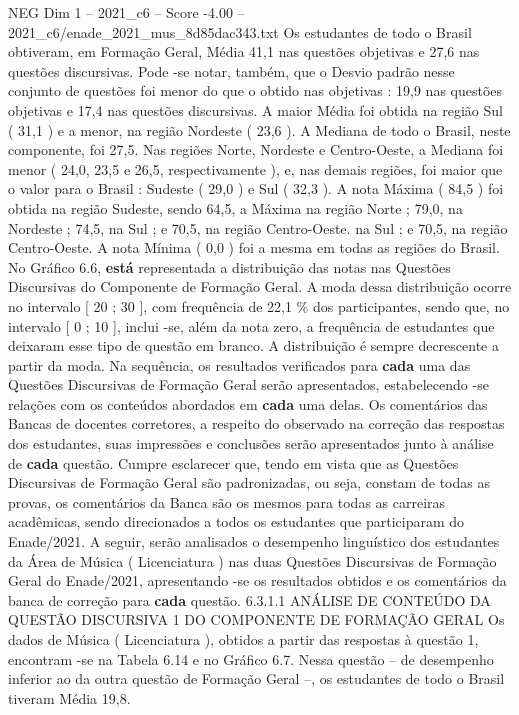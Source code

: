\begin{textsample}{NEG Dim 1 – 2021\_c6 – Score -4.00 – 2021\_c6/enade\_2021\_mus\_8d85dac343.txt}
Os estudantes de todo o Brasil obtiveram, em Formação Geral, Média 41,1 nas questões objetivas e 27,6 nas questões discursivas.
Pode -se notar, também, que o Desvio padrão nesse conjunto de questões foi menor do que o obtido nas objetivas : 19,9 nas questões objetivas e 17,4 nas questões discursivas.
A maior Média foi obtida na região Sul ( 31,1 ) e a menor, na região Nordeste ( 23,6 ).
A Mediana de todo o Brasil, neste componente, foi 27,5.
Nas regiões Norte, Nordeste e Centro-Oeste, a Mediana foi menor ( 24,0, 23,5 e 26,5, respectivamente ), e, nas demais regiões, foi maior que o valor para o Brasil : Sudeste ( 29,0 ) e Sul ( 32,3 ).
A nota Máxima ( 84,5 ) foi obtida na região Sudeste, sendo 64,5, a Máxima na região Norte ; 79,0, na Nordeste ; 74,5, na Sul ; e 70,5, na região Centro-Oeste. na Sul ; e 70,5, na região Centro-Oeste.
A nota Mínima ( 0,0 ) foi a mesma em todas as regiões do Brasil.
No Gráfico 6.6, \textbf{está} representada a distribuição das notas nas Questões Discursivas do Componente de Formação Geral.
A moda dessa distribuição ocorre no intervalo [ 20 ; 30 ], com frequência de 22,1 \% dos participantes, sendo que, no intervalo [ 0 ; 10 ], inclui -se, além da nota zero, a frequência de estudantes que deixaram esse tipo de questão em branco.
A distribuição é sempre decrescente a partir da moda.
Na sequência, os resultados verificados para \textbf{cada} uma das Questões Discursivas de Formação Geral serão apresentados, estabelecendo -se relações com os conteúdos abordados em \textbf{cada} uma delas.
Os comentários das Bancas de docentes corretores, a respeito do observado na correção das respostas dos estudantes, suas impressões e conclusões serão apresentados junto à análise de \textbf{cada} questão.
Cumpre esclarecer que, tendo em vista que as Questões Discursivas de Formação Geral são padronizadas, ou seja, constam de todas as provas, os comentários da Banca são os mesmos para todas as carreiras acadêmicas, sendo direcionados a todos os estudantes que participaram do Enade/2021.
A seguir, serão analisados o desempenho linguístico dos estudantes da Área de Música ( Licenciatura ) nas duas Questões Discursivas de Formação Geral do Enade/2021, apresentando -se os resultados obtidos e os comentários da banca de correção para \textbf{cada} questão. 6.3.1.1 ANÁLISE DE CONTEÚDO DA QUESTÃO DISCURSIVA 1 DO COMPONENTE DE FORMAÇÃO GERAL Os dados de Música ( Licenciatura ), obtidos a partir das respostas à questão 1, encontram -se na Tabela 6.14 e no Gráfico 6.7.
Nessa questão – de desempenho inferior ao da outra questão de Formação Geral –, os estudantes de todo o Brasil tiveram Média 19,8.

\end{textsample}
